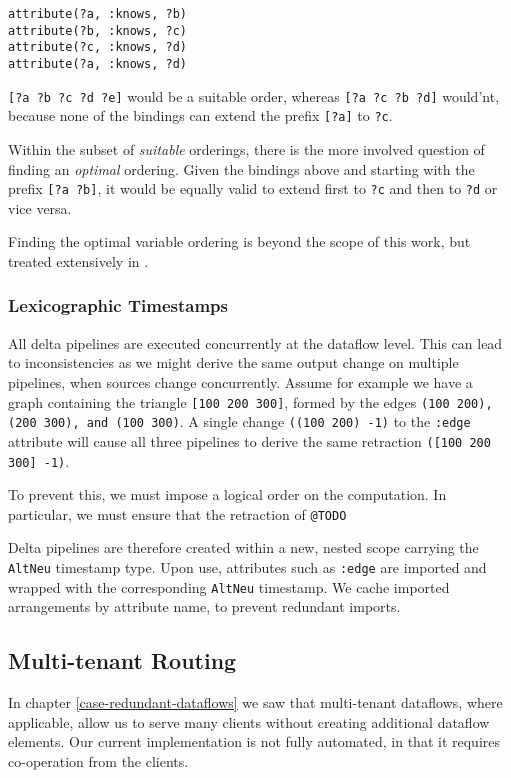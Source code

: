 \documentclass[../index.tex]{subfiles}
\begin{document}
\begin{verbatim}
attribute(?a, :knows, ?b)
attribute(?b, :knows, ?c)
attribute(?c, :knows, ?d)
attribute(?a, :knows, ?d)
\end{verbatim}

\texttt{[?a ?b ?c ?d ?e]} would be a suitable order, whereas
\texttt{[?a ?c ?b ?d]} would'nt, because none of the bindings can
extend the prefix \texttt{[?a]} to \texttt{?c}.

Within the subset of \emph{suitable} orderings, there is the more
involved question of finding an \emph{optimal} ordering. Given the
bindings above and starting with the prefix \texttt{[?a ?b]}, it would
be equally valid to extend first to \texttt{?c} and then to
\texttt{?d} or vice versa.

Finding the optimal variable ordering is beyond the scope of this
work, but treated extensively in \cite{abo2016faq}.

\subsubsection{Lexicographic Timestamps}

All delta pipelines are executed concurrently at the dataflow
level. This can lead to inconsistencies as we might derive the same
output change on multiple pipelines, when sources change
concurrently. Assume for example we have a graph containing the
triangle \texttt{[100 200 300]}, formed by the edges \texttt{(100
  200), (200 300), and (100 300)}. A single change \texttt{((100 200)
  -1)} to the \texttt{:edge} attribute will cause all three pipelines
to derive the same retraction \texttt{([100 200 300] -1)}.

To prevent this, we must impose a logical order on the computation. In
particular, we must ensure that the retraction of \texttt{@TODO}

Delta pipelines are therefore created within a new, nested scope
carrying the \texttt{AltNeu} timestamp type. Upon use, attributes such
as \texttt{:edge} are imported and wrapped with the corresponding
\texttt{AltNeu} timestamp. We cache imported arrangements by attribute
name, to prevent redundant imports.

\subsection{Multi-tenant Routing}

In chapter \ref{case-redundant-dataflows} we saw that multi-tenant
dataflows, where applicable, allow us to serve many clients without
creating additional dataflow elements. Our current implementation is
not fully automated, in that it requires co-operation from the
clients.
\end{document}
